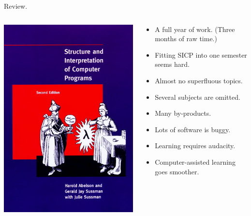 \documentclass[presentation, CJK, compress,aspectratio=169]{beamer}
\begin{document}
\begin{frame}[label={sec:orgc1a2302}]{Review.}
\begin{columns}
\begin{column}{0.4\columnwidth}
\begin{center}
\includegraphics[width=.9\linewidth]{SICP_cover.png}
\end{center}
\end{column}

\begin{column}{0.5\columnwidth}
\begin{itemize}
\item A full year of work. (Three months of raw time.)
\item Fitting SICP into one semester seems hard.
\item Almost no superfluous topics.
\item Several subjects are omitted.
\item Many by-products.
\item Lots of software is buggy.
\item Learning requires audacity.
\item Computer-assisted learning goes smoother.
\end{itemize}
\end{column}
\end{columns}


\end{frame}
\end{document}
